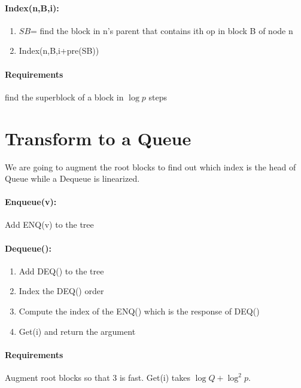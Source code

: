 \documentclass[12pt]{article}
\begin{document}
\paragraph{Index(n,B,i):}
\begin{enumerate}
  \item $SB$= find the block in n's parent that contains ith op in block B of node n
  \item Index(n,B,i+pre(SB))
\end{enumerate}

\paragraph{Requirements} find the superblock of a block in $\log p$ steps

\section*{Transform to a Queue} We are going to augment the root blocks to find out which index is the head of Queue while a Dequeue is linearized.

\paragraph{Enqueue(v):} Add ENQ(v) to the tree
\paragraph{Dequeue():}
\begin{enumerate}
  \item Add DEQ() to the tree
  \item Index the DEQ() order
  \item Compute the index of the ENQ() which is the response of DEQ()
\item Get(i) and return the argument
\end{enumerate}

\paragraph{Requirements}
Augment root blocks so that 3 is fast. Get(i) takes $\log Q+ \log^2 p$.
\end{document}
